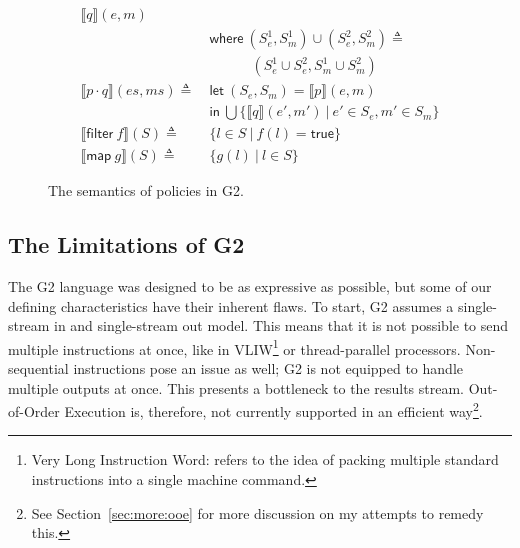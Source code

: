 \documentclass[sigconf,usenames,dvipsnames,svgnames,table]{acmart}
\newcommand{\interp}[1]{\llbracket #1 \rrbracket}
\def \sysname {\textsc{G2}\xspace}
\begin{document}
\begin{figure}
{\begin{align*}
              \interp { q }(e, m) \\
              &\mathsf{where}\ (S_e^1, S_m^1)\cup (S_e^2, S_m^2)\triangleq\\
              &\quad\quad\quad (S_e^1\cup S_e^2, S_m^1\cup S_m^2)\\
            \interp { p \cdot q }(es, ms)
              \triangleq\ &
              \mathsf{let}\ (S_e, S_m) = \interp{p}(e, m)\\
              &\mathsf{in}\ \bigcup \{\interp{q}(e',m')\ |\ e'\in S_e, m'\in S_m\}\\
              \hline
            \interp{\mathsf{filter}\ f}(S)
              \triangleq\ & \{l \in S\ |\ f(l) = \mathsf{true}\}\\
            \interp{\mathsf{map}\ g}(S)
              \triangleq\ &
              \{ g(l)\ |\ l\in S \} 
          \end{align*}}
          \caption{The semantics of policies in \sysname.}
          \label{fig:spec:sem:pol}
        \end{figure}

    \subsection{The Limitations of \sysname}\label{sec:spec:lim}
      The \sysname language was designed to be as expressive as possible, but some of our defining characteristics have their inherent flaws.
      To start, \sysname assumes a single-stream in and single-stream out model.
      This means that it is not possible to send multiple instructions at once, like in VLIW\footnote{
      Very Long Instruction Word: refers to the idea of packing multiple standard instructions into a single machine command.} or thread-parallel processors.
      Non-sequential instructions pose an issue as well; \sysname is not equipped to handle multiple outputs at once.
      This presents a bottleneck to the results stream.
      Out-of-Order Execution is, therefore, not currently supported in an efficient way\footnote{See Section~\ref{sec:more:ooe} for more discussion on my attempts to remedy this.}.
      \par
\end{document}
